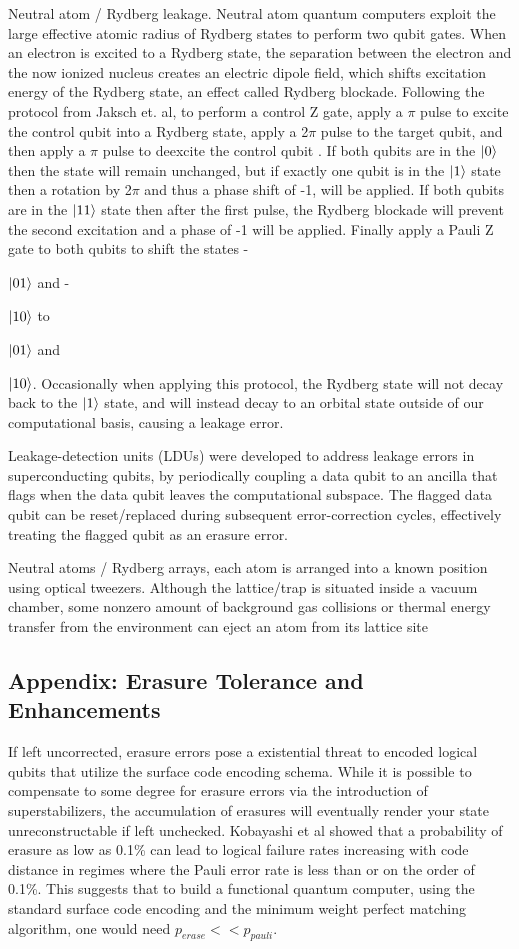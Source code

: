 \documentclass[11pt, notitlepage, letterpaper]{article}
\begin{document}
Neutral atom / Rydberg leakage. Neutral atom quantum computers exploit the large effective atomic radius of Rydberg states to perform two qubit gates. When an electron is excited to a Rydberg state, the separation between the electron and the now ionized nucleus creates an electric dipole field, which shifts excitation energy of the Rydberg state, an effect called Rydberg blockade. Following the protocol from Jaksch et. al, to perform a control Z gate, apply a {$\pi$} pulse to excite the control qubit into a Rydberg state, apply a 2{$\pi$} pulse to the target qubit, and then apply a {$\pi$} pulse to deexcite the control qubit \cite{jaksch_fast_2000}. If both qubits are in the {$\ket{0}$} then the state will remain unchanged, but if exactly one qubit is in the {$\ket{1}$} state then a rotation by 2{$\pi$} and thus a phase shift of -1, will be applied. If both qubits are in the {$\ket{11}$} state then after the first pulse, the Rydberg blockade will prevent the second excitation and a phase of -1 will be applied. Finally apply a Pauli Z gate to both qubits to shift the states -{$\ket{01}$ and -{$\ket{10}$ to {$\ket{01}$ and {$\ket{10}$. Occasionally when applying this protocol, the Rydberg state will not decay back to the {$\ket{1}$} state, and will instead decay to an orbital state outside of our computational basis, causing a leakage error. \cite{morgado_quantum_2021}

Leakage-detection units (LDUs) were developed to address leakage errors in superconducting qubits, by periodically coupling a data qubit to an ancilla that flags when the data qubit leaves the computational subspace. The flagged data qubit can be reset/replaced during subsequent error-correction cycles, effectively treating the flagged qubit as an erasure error.

Neutral atoms / Rydberg arrays, each atom is arranged into a known position using optical tweezers. Although the lattice/trap is situated inside a vacuum chamber, some nonzero amount of background gas collisions or thermal energy transfer from the environment can eject an atom from its lattice site

\subsection{Appendix: Erasure Tolerance and Enhancements}

If left uncorrected, erasure errors pose a existential threat to encoded logical qubits that utilize the surface code encoding schema. While it is possible to compensate to some degree for erasure errors via the introduction of superstabilizers, the accumulation of erasures will eventually render your state unreconstructable if left unchecked. Kobayashi et al showed that a probability of erasure as low as 0.1\% can lead to logical failure rates increasing with code distance in regimes where the Pauli error rate is less than or on the order of 0.1\%. This suggests that to build a functional quantum computer, using the standard surface code encoding and the minimum weight perfect matching algorithm, one would need $p_{erase} << p_{pauli}$.
\cite{kobayashi_erasure-tolerance_2025}

}}}}
\end{document}
